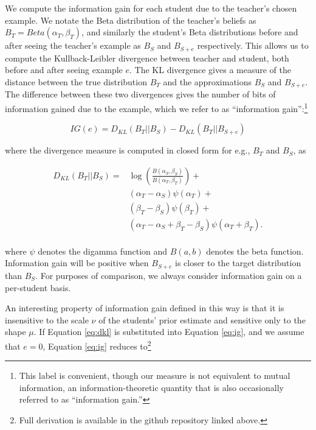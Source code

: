 \documentclass[10pt,letterpaper]{article}
\begin{document}
We compute the information gain for each student due to the teacher's chosen example. We notate the Beta distribution of the teacher's beliefs as $B_T = Beta(\alpha_T,\beta_T)$, and similarly the student's Beta distributions before and after seeing the teacher's example as $B_{S}$ and $B_{S+e}$ respectively. This allows us to compute the Kullback-Leibler divergence \cite{cover2012} between teacher and student, both before and after seeing example $e$. The KL divergence gives a measure of the distance between the true distribution $B_T$ and the approximations $B_{S}$ and $B_{S+e}$.
The difference between these two divergences gives the number of bits of information gained due to the example, which we refer to as ``information gain'':\footnote{This label is convenient, though our measure is not equivalent to mutual information, an information-theoretic quantity that is also occasionally referred to as ``information gain.''}


\begin{equation}
\label{eq:ig}
IG(e) = D_{KL} ( B_T || B_{S} )  - D_{KL} (B_T ||B_{S+e} ) 
\end{equation}

\noindent where the divergence measure is computed in closed form for e.g., $B_T$ and $B_S$, as

\begin{equation}
\label{eq:dkl}
\begin{split}
D_{KL} (B_T ||B_{S} )  = & \log( \frac{B(\alpha_{S},\beta_{S})}{B(\alpha_{T},\beta_{T})}) + \\
& (\alpha_T - \alpha_S) \psi (\alpha_T) + \\ 
& (\beta_T - \beta_S) \psi (\beta_T) + \\
& (\alpha_T - \alpha_S + \beta_T - \beta_S) \psi (\alpha_T + \beta_T). \\
\end{split}
\end{equation}

\noindent where $\psi$ denotes the digamma function and $B(a,b)$ denotes the beta function. Information gain will be positive when $B_{S+e}$ is closer to the target distribution than $B_S$. For purposes of comparison, we always consider information gain on a per-student basis. 

An interesting property of information gain defined in this way is that it is insensitive to the scale $\nu$ of the students' prior estimate and sensitive only to the shape $\mu$. If Equation \ref{eq:dkl} is substituted into Equation \ref{eq:ig}, and we assume that $e=0$, Equation \ref{eq:ig} reduces to\footnote{Full derivation is available in the github repository linked above.} 
\end{document}
